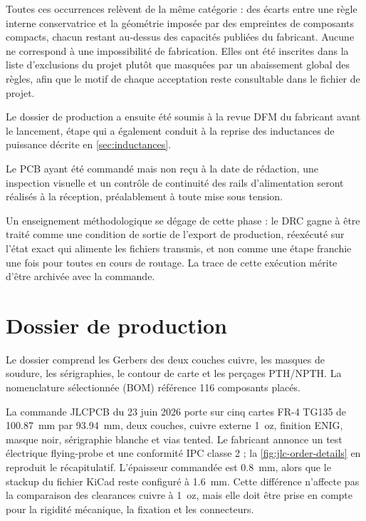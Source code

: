 Toutes ces occurrences relèvent de la même catégorie : des écarts entre une règle interne conservatrice et la géométrie imposée par des empreintes de composants compacts, chacun restant au-dessus des capacités publiées du fabricant. Aucune ne correspond à une impossibilité de fabrication. Elles ont été inscrites dans la liste d'exclusions du projet plutôt que masquées par un abaissement global des règles, afin que le motif de chaque acceptation reste consultable dans le fichier de projet.

Le dossier de production a ensuite été soumis à la revue DFM du fabricant avant le lancement, étape qui a également conduit à la reprise des inductances de puissance décrite en \cref{sec:inductances}.

Le PCB ayant été commandé mais non reçu à la date de rédaction, une inspection visuelle et un contrôle de continuité des rails d'alimentation seront réalisés à la réception, préalablement à toute mise sous tension.

Un enseignement méthodologique se dégage de cette phase : le DRC gagne à être traité comme une condition de sortie de l'export de production, réexécuté sur l'état exact qui alimente les fichiers transmis, et non comme une étape franchie une fois pour toutes en cours de routage. La trace de cette exécution mérite d'être archivée avec la commande.

\section{Dossier de production}

Le dossier comprend les Gerbers des deux couches cuivre, les masques de soudure, les sérigraphies, le contour de carte et les perçages PTH/NPTH. La nomenclature sélectionnée (BOM) référence 116 composants placés.

La commande JLCPCB du 23 juin 2026 porte sur cinq cartes FR-4 TG135 de \SI{100.87}{\milli\metre} par \SI{93.94}{\milli\metre}, deux couches, cuivre externe \SI{1}{oz}, finition ENIG, masque noir, sérigraphie blanche et vias tented. Le fabricant annonce un test électrique flying-probe et une conformité IPC classe 2 ; la \cref{fig:jlc-order-details} en reproduit le récapitulatif. L'épaisseur commandée est \SI{0.8}{\milli\metre}, alors que le stackup du fichier KiCad reste configuré à \SI{1.6}{\milli\metre}. Cette différence n'affecte pas la comparaison des clearances cuivre à \SI{1}{oz}, mais elle doit être prise en compte pour la rigidité mécanique, la fixation et les connecteurs.

